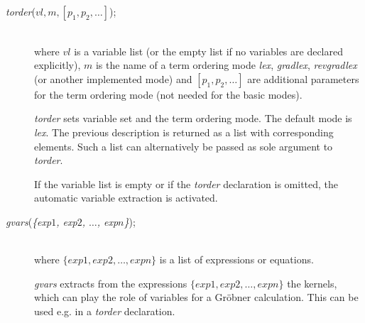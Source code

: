 \begin{description}
\item[{{\it torder}($vl,m,[p_1,p_2,\ldots]$);}]\mbox{}\\
  \hypertarget{operator:TORDER}{}
where $vl$ is a variable list (or the empty list if
no variables are declared explicitly),
$m$ is the name of a term ordering mode \emph{lex}, \emph{gradlex},
\emph{revgradlex} (or another implemented mode) and
$[p_1,p_2,\ldots]$ are additional parameters for the
term ordering mode (not needed for the basic modes).

\emph{torder} sets variable set and the term ordering mode.
The default mode is \emph{lex}. The previous description is returned
as a list with corresponding elements. Such a list can
alternatively be passed as sole argument to \emph{torder}.

If the variable list is empty or if the \emph{torder} declaration
is omitted, the automatic variable extraction is activated.

\item[{\it gvars}({\it\{exp$1$, exp$2$, $\ldots$, exp$n$\}});]\mbox{}\\
\hypertarget{operator:GVARS}{}
  where $\{exp1, exp2, \ldots , expn\}$ is a list of expressions or
equations.

\emph{gvars} extracts from the expressions $\{exp1, exp2, \ldots , expn\}$
the kernels, which can play the role of variables for a Gr\"obner
calculation. This can be used e.g. in a \emph{torder} declaration.
\end{description}


